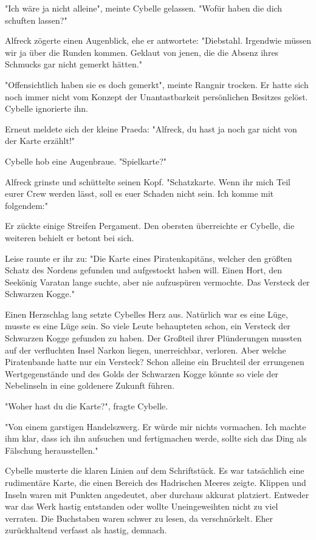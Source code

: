 "Ich wäre ja nicht alleine", meinte Cybelle gelassen. "Wofür haben die  dich schuften lassen?"

Alfreck zögerte einen Augenblick, ehe er antwortete: "Diebstahl. Irgendwie müssen wir ja über die Runden kommen. Geklaut von jenen, die die Absenz ihres Schmucks gar nicht gemerkt hätten."

"Offensichtlich haben sie es doch gemerkt", meinte Rangnir trocken. Er hatte sich noch immer nicht vom Konzept der Unantastbarkeit persönlichen Besitzes gelöst. Cybelle ignorierte ihn.

Erneut meldete sich der kleine Praeda: "Alfreck, du hast ja noch gar nicht von der Karte erzählt!"

Cybelle hob eine Augenbraue. "Spielkarte?"

Alfreck grinste und schüttelte seinen Kopf. "Schatzkarte. Wenn ihr mich Teil eurer Crew werden lässt, soll es euer Schaden nicht sein. Ich komme mit folgendem:"

Er zückte einige Streifen Pergament. Den obersten überreichte er Cybelle, die weiteren behielt er betont bei sich.

Leise raunte er ihr zu: "Die Karte eines Piratenkapitäns, welcher den größten Schatz des Nordens gefunden und aufgestockt haben will. Einen Hort, den Seekönig Varatan lange suchte, aber nie aufzuspüren vermochte. Das Versteck der Schwarzen Kogge."

Einen Herzschlag lang setzte Cybelles Herz aus. Natürlich war es eine Lüge, musste es eine Lüge sein. So viele Leute behaupteten schon, ein Versteck der Schwarzen Kogge gefunden zu haben. Der Großteil ihrer Plünderungen mussten auf der verfluchten Insel Narkon liegen, unerreichbar, verloren. Aber welche Piratenbande hatte nur ein Versteck? Schon alleine ein Bruchteil der errungenen Wertgegenstände und des Golds der Schwarzen Kogge könnte so viele  der Nebelinseln in eine goldenere Zukunft führen.

"Woher hast du die Karte?", fragte Cybelle.

"Von einem garstigen Handelszwerg. Er würde mir nichts vormachen. Ich machte ihm klar, dass ich ihn aufsuchen und fertigmachen werde, sollte sich das Ding als Fälschung herausstellen."

Cybelle musterte die klaren Linien auf dem Schriftstück. Es war tatsächlich eine rudimentäre Karte, die einen Bereich des Hadrischen Meeres zeigte. Klippen und Inseln waren mit Punkten angedeutet, aber durchaus akkurat platziert. Entweder war das Werk hastig entstanden oder wollte Uneingeweihten nicht zu viel verraten. Die Buchstaben waren schwer zu lesen, da verschnörkelt. Eher zurückhaltend verfasst als hastig, demnach.


